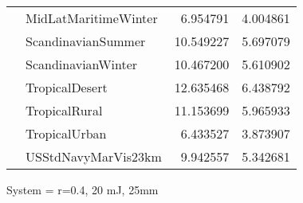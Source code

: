 \begin{tabular}{llrr}
             & MidLatMaritimeWinter &   6.954791 &  4.004861 \\
             & ScandinavianSummer &  10.549227 &  5.697079 \\
             & ScandinavianWinter &  10.467200 &  5.610902 \\
             & TropicalDesert &  12.635468 &  6.438792 \\
             & TropicalRural &  11.153699 &  5.965933 \\
             & TropicalUrban &   6.433527 &  3.873907 \\
             & USStdNavyMarVis23km &   9.942557 &  5.342681 \\
\bottomrule
\end{tabular}


\clearpage
System =  r=0.4, 20 mJ, 25mm

